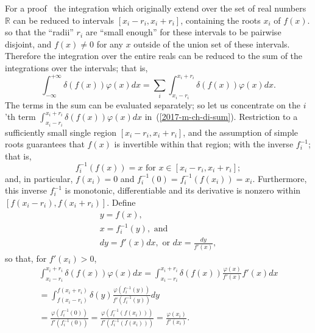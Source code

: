 {For a proof~\cite{Cortizo-95} the integration which originally extend over the set of real numbers $\mathbb{R}$
can be reduced to intervals $[x_i-r_i,x_i+r_i]$, containing the roots $x_i$ of $f(x)$.
so that  the ``radii'' $r_i$  are ``small enough'' for these intervals to be pairwise disjoint,
and $f(x) \neq 0$ for any $x$ outside of the union set of these intervals.
Therefore the integration over the entire reals can be reduced to the sum of the integrations
over the intervals; that is,
\begin{equation}
\int_{-\infty}^{+\infty} \delta (f(x)) \varphi(x) dx
=
\sum_i
\int_{x_i-r_i}^{x_i+r_i} \delta (f(x)) \varphi(x) dx
.
\label{2017-m-ch-di-sum}
\end{equation}
The terms in the sum can be evaluated separately; so let us concentrate on the $i$'th term
$\int_{x_i-r_i}^{x_i+r_i} \delta (f(x)) \varphi(x) dx    $ in~(\ref{2017-m-ch-di-sum}).
Restriction to a sufficiently small single region $[x_i-r_i,x_i+r_i]$, and the assumption of simple roots
guarantees that $f(x)$ is invertible within that region; with the inverse $f_i^{-1}$; that is,
\begin{equation}
f_i^{-1}(f(x))=x \text{ for } x \in  [x_i-r_i,x_i+r_i]
;
\end{equation}
and, in particular, $f(x_i)=0$ and $f_i^{-1}(0) =f_i^{-1}(f(x_i))=x_i$.
Furthermore, this inverse $f_i^{-1}$ is monotonic, differentiable and its derivative is nonzero within $[f(x_i-r_i),f(x_i+r_i)]$.
Define
\begin{equation}
\begin{split}
y = f(x),\\
x = f_i^{-1} (y), \text{ and}\\
dy = f'(x) dx , \text{ or } dx = \frac{dy}{f'(x)}
,
\end{split}
\end{equation}
 so that, for  $f'(x_i)>0$,
\begin{equation}
\begin{split}
\int_{x_i-r_i}^{x_i+r_i} \delta (f(x)) \varphi(x) dx
=
\int_{x_i-r_i}^{x_i+r_i} \delta (f(x)) \frac{\varphi(x)}{f'(x)} f'(x)  dx   \\
=
\int_{f(x_i-r_i)}^{f(x_i+r_i)} \delta (y) \frac{\varphi(f_i^{-1} (y))}{f'(f_i^{-1} (y))}   dy  \\
=  \frac{\varphi(f_i^{-1} (0))}{f'(f_i^{-1} (0))}
=  \frac{\varphi(f_i^{-1} (f(x_i)))}{f'(f_i^{-1} (f(x_i)))}
=  \frac{\varphi( x_i)}{f'( x_i )}.
\end{split}

\end{equation}}
